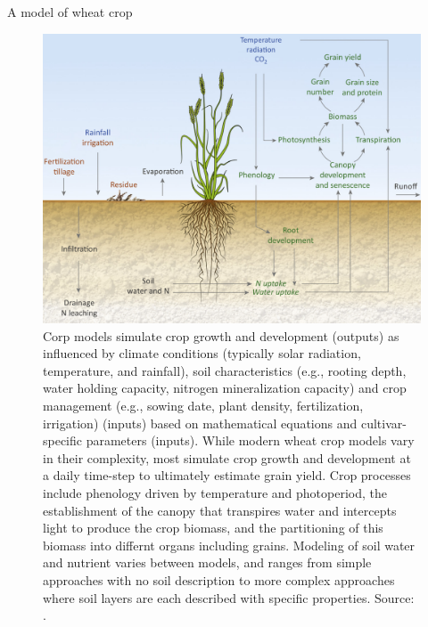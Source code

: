 \documentclass[11pt,dvipsnames,ignorenonframetext,aspectratio=169]{beamer}
\begin{document}
\begin{frame}{A model of wheat crop}
\protect\hypertarget{a-model-of-wheat-crop}{}
\begin{figure}
\includegraphics[width=0.42\linewidth]{../images/wheat_mechanistic_processes} \caption{Corp models simulate crop growth and development (outputs) as influenced by climate conditions (typically solar radiation, temperature, and rainfall), soil characteristics (e.g., rooting depth, water holding capacity, nitrogen mineralization capacity) and crop management (e.g., sowing date, plant density, fertilization, irrigation) (inputs) based on mathematical equations and cultivar-specific parameters (inputs). While modern wheat crop models vary in their complexity, most simulate crop growth and development at a daily time-step to ultimately estimate grain yield. Crop processes include phenology driven by temperature and photoperiod, the establishment of the canopy that transpires water and intercepts light to produce the crop biomass, and the partitioning of this biomass into differnt organs including grains. Modeling of soil water and nutrient varies between models, and ranges from simple approaches with no soil description to more complex approaches where soil layers are each described with specific properties. Source: \cite{chenu2017contribution}.}\label{fig:wheat-crop-model}
\end{figure}
\end{frame}
\end{document}
